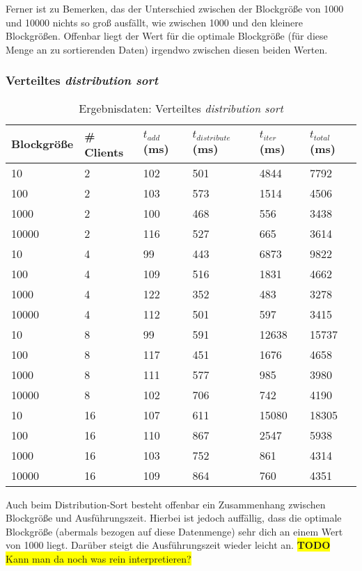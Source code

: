 \documentclass[fontsize=12pt,a4paper,headinclude=no,headings=small]{scrartcl}
\newcommand{\todo}[1]{\colorbox{yellow}{\textbf{TODO} #1}}
\begin{document}
Ferner ist zu Bemerken, das der Unterschied zwischen der Blockgröße von 1000 und 10000 nichts so groß ausfällt, wie zwischen 1000 und den kleinere Blockgrößen. Offenbar liegt der Wert für die optimale Blockgröße (für diese Menge an zu sortierenden Daten) irgendwo zwischen diesen beiden Werten.

\subsubsection{Verteiltes \textit{distribution sort}}
\begin{table}[htp]
\begin{tabularx}{\textwidth}{ |X|X|X|X|X|X| }
\hline
Blockgröße & \# Clients & $t_{add}$ (ms) & $t_{distribute}$ (ms) & $t_{iter}$ (ms) & $t_{total}$ (ms) \\
\hline
10 & 2 & 102 & 501 & 4844 & 7792 \\
100 & 2 & 103 & 573 & 1514 & 4506 \\
1000 & 2 & 100 & 468 & 556 & 3438 \\
10000 & 2 & 116 & 527 & 665 & 3614 \\
\hline
10 & 4 & 99 & 443 & 6873 & 9822 \\ 
100 & 4 & 109 & 516 & 1831 & 4662 \\ 
1000 & 4 & 122 & 352 & 483 & 3278 \\ 
10000 & 4 & 112 & 501 & 597 & 3415 \\
\hline
10 & 8 & 99 & 591 & 12638 & 15737 \\
100 & 8 & 117 & 451 & 1676 & 4658 \\
1000 & 8 & 111 & 577 & 985 & 3980 \\
10000 & 8 & 102 & 706 & 742 & 4190 \\
\hline
10 & 16 & 107 & 611 & 15080 & 18305 \\
100 & 16 & 110 & 867 & 2547 & 5938 \\
1000 & 16 & 103 & 752 & 861 & 4314 \\
10000 & 16 & 109 & 864 & 760 & 4351 \\
\hline
\end{tabularx}
\caption{Ergebnisdaten: Verteiltes \textit{distribution sort}}
\end{table}
Auch beim Distribution-Sort besteht offenbar ein Zusammenhang zwischen Blockgröße und Ausführungszeit. Hierbei ist jedoch auffällig, dass die optimale Blockgröße (abermals bezogen auf diese Datenmenge) sehr dich an einem Wert von 1000 liegt. Darüber steigt die Ausführungszeit wieder leicht an. \todo{Kann man da noch was rein interpretieren?} 
\end{document}
